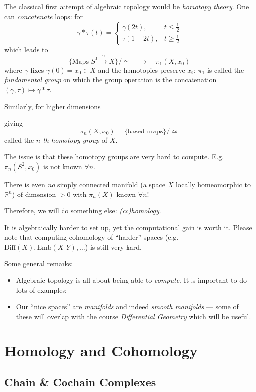 \documentclass[a4paper,11pt]{article}
\begin{document}
	The classical first attempt of algebraic topology would be \emph{homotopy theory}. One can \emph{concatenate} loops:
	for
	\[
		\gamma * \tau (t) = \begin{cases}
			\gamma(2t),& t \leq \frac{1}{2}\\
			\tau(1 - 2t),& t \geq \frac{1}{2}
		\end{cases}
	\]
	which leads to
	\[
		\{\text{Maps }S^1 \xrightarrow{\gamma} X\} / \simeq \quad  \longrightarrow \quad \pi_1(X,x_0)
	\]
	where $\gamma$ fixes $\gamma(0) = x_0 \in X$ and the homotopies preserve $x_0$; 
	$\pi_1$ is called the \emph{fundamental group} on which the group operation is the concatenation $(\gamma, \tau) \mapsto \gamma * \tau$. 
	
	Similarly, for higher dimensions 

	giving
	\[
		\pi_n (X, x_0) = \{\text{based maps}\} / \simeq
	\]
	called the \emph{$n$-th homotopy group} of $X$.

	The issue is that these homotopy groups are very hard to compute. E.g.\ $\pi_n (S^2, x_0)$ is not known $\forall n$.
	
	There is even \emph{no} simply connected manifold (a space $X$ locally homeomorphic to $\mathbb{R}^n$) of dimension $> 0$ with $\pi_n (X)$ known $\forall n$!
	
	Therefore, we will do something else: \emph{(co)homology}.

	It is algebraically harder to set up, yet the computational gain is worth it. Please note that computing cohomology of ``harder'' spaces (e.g.\ $\text{Diff}(X), \text{Emb}(X,Y), \dots$) is still very hard.

	Some general remarks:
	\begin{itemize}
		\item Algebraic topology is all about being able to \emph{compute}. It is important to do lots of examples;
		\item Our ``nice spaces'' are \emph{manifolds} and indeed \emph{smooth manifolds} --- some of these will overlap with the course \emph{Differential Geometry} which will be useful. 
	\end{itemize}

	\newpage
	\section{Homology and Cohomology}
	\subsection{Chain \& Cochain Complexes} 
\end{document}
